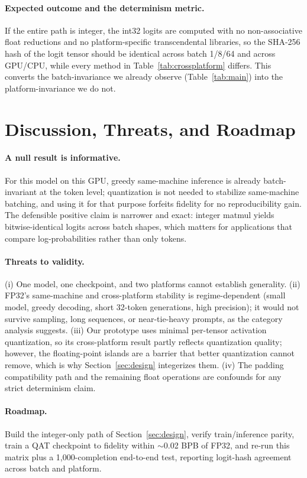\documentclass[wcp]{jmlr}
\begin{document}
\paragraph{Expected outcome and the determinism metric.} If the entire path is
integer, the int32 logits are computed with no non-associative float reductions and
no platform-specific transcendental libraries, so the SHA-256 hash of the logit
tensor should be identical across batch 1/8/64 and across GPU/CPU, while every method
in Table~\ref{tab:crossplatform} differs. This converts the batch-invariance we
already observe (Table~\ref{tab:main}) into the platform-invariance we do not.

\section{Discussion, Threats, and Roadmap}
\paragraph{A null result is informative.} For this model on this GPU, greedy
same-machine inference is already batch-invariant at the token level; quantization is
not needed to stabilize same-machine batching, and using it for that purpose forfeits
fidelity for no reproducibility gain. The defensible positive claim is narrower and
exact: integer matmul yields bitwise-identical logits across batch shapes, which
matters for applications that compare log-probabilities rather than only tokens.

\paragraph{Threats to validity.} (i) One model, one checkpoint, and two platforms
cannot establish generality. (ii) FP32's same-machine and cross-platform stability is
regime-dependent (small model, greedy decoding, short 32-token generations, high
precision); it would not survive sampling, long sequences, or near-tie-heavy prompts,
as the category analysis suggests. (iii) Our prototype uses minimal per-tensor
activation quantization, so its cross-platform result partly reflects quantization
quality; however, the floating-point islands are a barrier that better quantization
cannot remove, which is why Section~\ref{sec:design} integerizes them. (iv) The
padding compatibility path and the remaining float operations are confounds for any
strict determinism claim.

\paragraph{Roadmap.} Build the integer-only path of Section~\ref{sec:design}, verify
train/inference parity, train a QAT checkpoint to fidelity within $\sim$0.02 BPB of
FP32, and re-run this matrix plus a 1{,}000-completion end-to-end test, reporting
logit-hash agreement across batch and platform.
\end{document}
